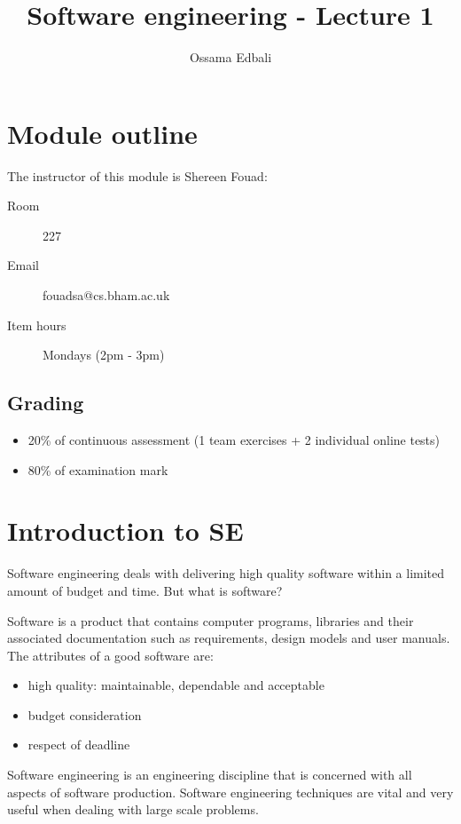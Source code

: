 \documentclass{article}
\title{Software engineering - Lecture 1}
\author{Ossama Edbali}
\begin{document}
	\maketitle
	
	\section{Module outline}
	The instructor of this module is Shereen Fouad:
	\begin{description}
		\item[Room] 227
		\item[Email] fouadsa@cs.bham.ac.uk
		\item[Item hours] Mondays (2pm - 3pm)
	\end{description}
	
	\subsection*{Grading}
	\begin{itemize}
		\item 20\% of continuous assessment (1 team exercises + 2 individual online tests)
		\item 80\% of examination mark
	\end{itemize}		
	
	\section{Introduction to SE}
	Software engineering deals with delivering high quality software within a
	limited amount of budget and time. But what is software?
	
	Software is a product that contains computer programs, libraries
	and their associated documentation such as requirements, design models and user manuals.
	The attributes of a good software are:
	\begin{itemize}
		\item high quality: maintainable, dependable and acceptable
		\item budget consideration
		\item respect of deadline
	\end{itemize}		
	
	Software engineering is an engineering discipline
	that is concerned with all aspects of software production. Software engineering
	techniques are vital and very useful when dealing with large scale problems.
	
\end{document}
